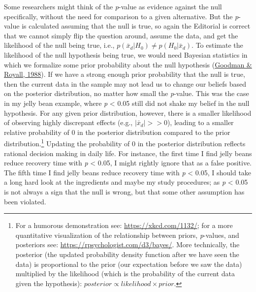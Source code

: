 \documentclass[]{cik}%
\begin{document}
Some researchers might think of the \emph{p}-value as evidence against
the null specifically, without the need for comparison to a given
alternative. But the \emph{p}-value is calculated assuming that the null
is true, so again the Editorial is correct that we cannot simply flip
the question around, assume the data, and get the likelihood of the null
being true, i.e., \(p(\bar{x}_{d}|H_{0}) \neq p(H_{0}|\bar{x}_{d})\). To
estimate the likelihood of the null hypothesis being true, we would need
Bayesian statistics in which we formalize some prior probability about
the null hypothesis (\protect\hyperlink{ref-9}{Goodman \& Royall,
1988}). If we have a strong enough prior probability that the null is
true, then the current data in the sample may not lead us to change our
beliefs based on the posterior distribution, no matter how small the
\emph{p}-value. This was the case in my jelly bean example, where
\emph{p} \textless{} 0.05 still did not shake my belief in the null
hypothesis. For any given prior distribution, however, there is a
smaller likelihood of observing highly discrepant effects (e.g.,
\(|\bar{x}_{d}| >> 0\)), leading to a smaller relative probability of 0
in the posterior distribution compared to the prior
distribution.\footnote{For a humorous demonstration see:
  \url{https://xkcd.com/1132/}; for a more quantitative visualization of
  the relationship between priors, \emph{p}-values, and posteriors see:
  \url{https://rpsychologist.com/d3/bayes/}. More technically, the
  posterior (the updated probability density function after we have seen
  the data) is proportional to the prior (our expectation before we saw
  the data) multiplied by the likelihood (which is the probability of
  the current data given the hypothesis):
  \(posterior \propto likelihood \times prior\).} Updating the
probability of 0 in the posterior distribution reflects rational
decision making in daily life. For instance, the first time I find jelly
beans reduce recovery time with \emph{p} \textless{} 0.05, I might
rightly ignore that as a false positive. The fifth time I find jelly
beans reduce recovery time with \emph{p} \textless{} 0.05, I should take
a long hard look at the ingredients and maybe my study procedures; as
\emph{p} \textless{} 0.05 is not always a sign that the null is wrong,
but that some other assumption has been violated.
\end{document}
